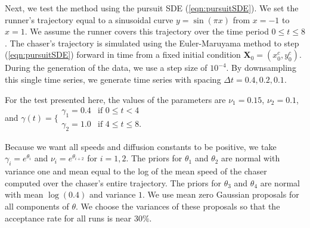 \documentclass[graybox]{svmult}
\begin{document}
Next, we test the method using the pursuit SDE
(\ref{eqn:pursuitSDE}).  We set the runner's trajectory equal to a
sinusoidal curve $y = \sin (\pi x)$ from $x=-1$ to $x=1$.  We assume
the runner covers this trajectory over the time period $0 \leq t \leq
8$.  The chaser's trajectory is simulated using the Euler-Maruyama
method to step (\ref{eqn:pursuitSDE}) forward in time from a fixed
initial condition $\mathbf{X}_0 = (x^c_0, y^c_0)$.  During the
generation of the data, we use a step size of $10^{-4}$.  By
downsampling this single time series, we generate time series with
spacing $\Delta t = 0.4, 0.2, 0.1$.  

For the test presented here, the values of the parameters are  $\nu_1
= 0.15$, $\nu_2 = 0.1$, and $\gamma(t) =
\biggl\{
	\begin{array}{ll}
		\gamma_1 = 0.4  & \mbox{if } 0 \leq t < 4 \\
		\gamma_2 = 1.0 & \mbox{if } 4 \leq t \leq 8.
	\end{array}$

Because we want all speeds and diffusion constants to be positive, we
take $\gamma_i = e^{\theta_i}$ and $\nu_i = e^{\theta_{i+2}}$ for $i =
1, 2$.  The priors for $\theta_1$ and $\theta_2$ are normal with
variance one and mean equal to the log of the mean speed of the chaser computed over the chaser's
entire trajectory. The priors for $\theta_3$ and $\theta_4$ are normal with mean
$\log(0.4)$ and variance $1$.  We use mean zero Gaussian proposals for all
components of $\theta$.  We choose the variances of these proposals so
that the acceptance rate for all runs is near $30\%$.
\end{document}
